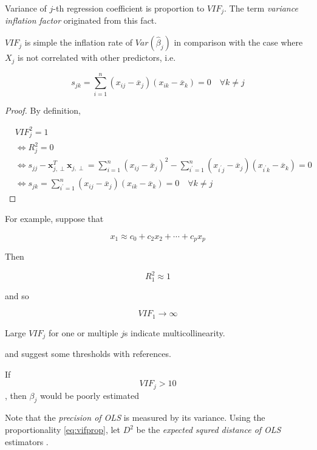 \documentclass[]{book}
\theoremstyle{definition}
\theoremstyle{definition}
\theoremstyle{definition}
\theoremstyle{remark}
\let\BeginKnitrBlock\begin \let\EndKnitrBlock\end
\begin{document}
Variance of \(j\)-th regression coefficient is proportion to \(VIF_j\). The term \emph{variance inflation factor} originated from this fact.

\BeginKnitrBlock{corollary}
\protect\hypertarget{cor:vifcorr}{}{\label{cor:vifcorr} }\(VIF_j\) is simple the inflation rate of \(Var(\hat\beta_j)\) in comparison with the case where \(X_j\) is not correlated with other predictors, i.e.

\[s_{jk} = \sum_{i = 1}^n (x_{ij} - \overline{x}_j)(x_{ik} - \overline{x}_k) = 0 \quad \forall k \neq j\]
\EndKnitrBlock{corollary}

\BeginKnitrBlock{proof}
{}By definition,

\begin{equation*}
  \begin{split}
    & VIF_j^2 = 1 \\
    & \Leftrightarrow R_j^2 = 0 \\
    & \Leftrightarrow s_{jj} - \mathbf{x}_{j, \perp}^T \mathbf{x}_{j, \perp} = \sum_{i = 1}^n (x_{ij} - \overline{x}_j)^2 - \sum_{i^{\prime} = 1}^n (x_{i^{\prime}j} - \overline{x}_j) (x_{i^{\prime}k} - \overline{x}_k) = 0 \\
    & \Leftrightarrow s_{jk} = \sum_{i^{\prime} = 1}^n (x_{ij} - \overline{x}_j) (x_{ik} - \overline{x}_k) = 0 \quad \forall k \neq j
  \end{split}
\end{equation*}
\EndKnitrBlock{proof}

For example, suppose that

\[x_1 \approx c_0 + c_2 x_2 + \cdots + c_p x_p\]

Then

\[R_1^2 \approx 1\]

and so

\[VIF_1 \rightarrow \infty\]

\BeginKnitrBlock{remark}
{}Large \(VIF_j\) for one or multiple \(j\)s indicate multicollinearity.
\EndKnitrBlock{remark}

\citet{Rawlings:2006aa} and \citet{Chatterjee:2015aa} suggest some thresholds with references.

\BeginKnitrBlock{conjecture}
\protect\hypertarget{cnj:vifthres1}{}{\label{cnj:vifthres1} }If \[VIF_j > 10\],
then \(\beta_j\) would be poorly estimated
\EndKnitrBlock{conjecture}

Note that the \emph{precision of OLS} is measured by its variance. Using the proportionality \eqref{eq:vifprop}, let \(D^2\) be the \emph{expected squred distance of OLS} estimators \citep{Chatterjee:2015aa}.
\end{document}
